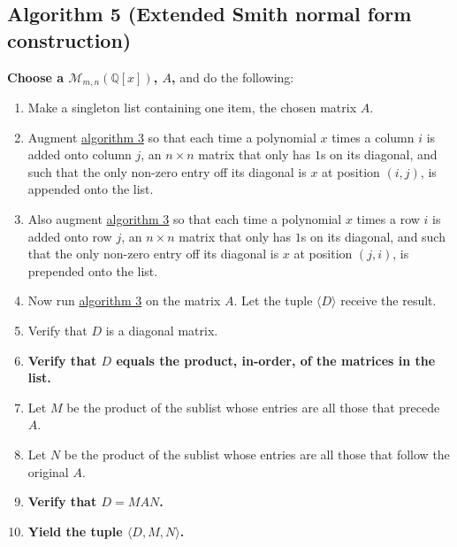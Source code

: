 \documentclass[twocolumn]{article}
\begin{document}
		\subsection{Algorithm 5 (Extended Smith normal form construction)}\label{sec:algorithm 5}
			\textbf{Choose a $\mathcal{M}_{m,n}(\mathbb{Q}[x])$, $A$,} and do the following:
			\begin{enumerate}
				\item Make a singleton list containing one item, the chosen matrix $A$.
				\item Augment \hyperref[sec:algorithm 3]{algorithm 3} so that each time a polynomial $x$ times a column $i$ is added onto column $j$, an $n\times n$ matrix that only has $1$s on its diagonal, and such that the only non-zero entry off its diagonal is $x$ at position $(i,j)$, is appended onto the list.
				\item Also augment \hyperref[sec:algorithm 3]{algorithm 3} so that each time a polynomial $x$ times a row $i$ is added onto row $j$, an $n\times n$ matrix that only has $1$s on its diagonal, and such that the only non-zero entry off its diagonal is $x$ at position $(j,i)$, is prepended onto the list.
				\item Now run \hyperref[sec:algorithm 3]{algorithm 3} on the matrix $A$. Let the tuple $\langle D\rangle$ receive the result.
				\item Verify that $D$ is a diagonal matrix.
				\item\textbf{Verify that $D$ equals the product, in-order, of the matrices in the list.}
				\item Let $M$ be the product of the sublist whose entries are all those that precede $A$.
				\item Let $N$ be the product of the sublist whose entries are all those that follow the original $A$.
				\item\textbf{Verify that $D=MAN$.}
				\item \textbf{Yield the tuple $\langle D,M,N\rangle$.}
			\end{enumerate}
\end{document}
